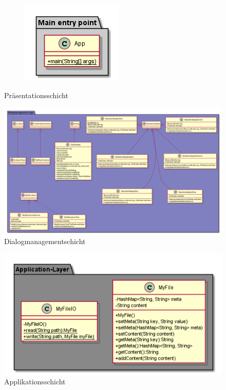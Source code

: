\begin{figure}[H]
\begin{subfigure}[b]{0.5\linewidth}
    \end{subfigure}
    \begin{subfigure}[b]{0.4\linewidth}
        \includegraphics[width=\linewidth]{figures/class/class_diagram_main.png}    
    \end{subfigure}
    \caption{Präsentationsschicht}
    \label{fig:presentationlayer}
\end{figure}
\begin{figure}[H]
    \centering
    \includegraphics[width=\linewidth]{figures/class/class_diagram_dialogmanagement.png}
    \caption{Dialogmanagementschicht}
    \label{fig:dialogmanagementlayer}
\end{figure}
\begin{figure}[H]
    \centering
    \includegraphics[width=0.7\linewidth]{figures/class/class_diagram_application.png}
    \caption{Applikationsschicht}
    \label{fig:applicationlayer}
\end{figure}
